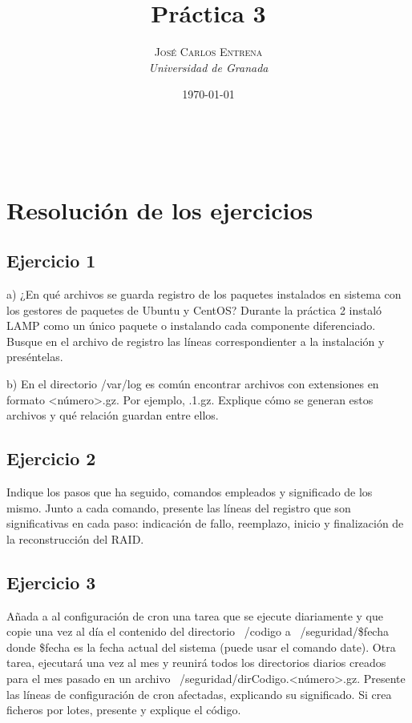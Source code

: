\documentclass[a4paper, 11pt]{article} %
\title{\textbf{Práctica 3}\\ %
} %
\author{\textsc{José Carlos Entrena} %
\\{\textit{Universidad de Granada}}} %
\date{\today} %
\makeatletter
\renewcommand{\maketitle}{ %
\begin{flushright} %
{\LARGE\@title} %

\vspace{60pt} %

{\large\@author} %
\\\@date %

\vspace{40pt} %
\end{flushright}
}
\makeatother
\begin{document}
\maketitle %

{\parskip=2pt
  \tableofcontents
}   %

\pagebreak %

\section{Resolución de los ejercicios}

\subsection{Ejercicio 1}
a) ¿En qué archivos se guarda registro de los paquetes instalados en sistema con los gestores de paquetes de Ubuntu y CentOS? Durante la práctica 2 instaló LAMP como un único paquete o instalando cada componente diferenciado. Busque en el archivo de registro las líneas correspondienter a la instalación y preséntelas. 

b) En el directorio /var/log es común encontrar archivos con extensiones en formato <número>.gz. Por ejemplo, .1.gz. Explique cómo se generan estos archivos y qué relación guardan entre ellos. 


\subsection{Ejercicio 2}
Indique los pasos que ha seguido, comandos empleados y significado de los mismo. Junto a cada comando, presente las líneas del registro que son significativas en cada paso: indicación de fallo, reemplazo, inicio y finalización de la reconstrucción del RAID. 

\subsection{Ejercicio 3}
Añada a al configuración de cron una tarea que se ejecute diariamente y que copie una vez al día el contenido del directorio ~/codigo a ~/seguridad/\$fecha donde \$fecha es la fecha actual del sistema (puede usar el comando date). Otra tarea, ejecutará una vez al mes y reunirá todos los directorios diarios creados para el mes pasado en un archivo ~/seguridad/dirCodigo.<número>.gz. Presente las líneas de configuración de cron afectadas, explicando su significado. Si crea ficheros por lotes, presente y explique el código. 
\end{document}
